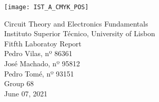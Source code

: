\thispagestyle {empty}


\texttt{[image: IST\_A\_CMYK\_POS]}

\begin{center}

\vspace{1.0cm}

\vspace{1cm}
{\FontLb Circuit Theory and Electronics Fundamentals} \\ 
\vspace{0.5cm}
{\FontSn Instituto Superior Técnico, University of Lisbon} \\ 
\vspace{0.5cm}
{\FontSn Fitfth Laboratoy Report} \\
\vspace{0.5cm}
{\FontSn Pedro Vilas, nº 86361} \\
{\FontSn José Machado, nº 95812} \\
{\FontSn Pedro Tomé, nº 93151} \\
{\FontSn Group 68} \\


{\FontSn June 07, 2021} \\
\end{center}


